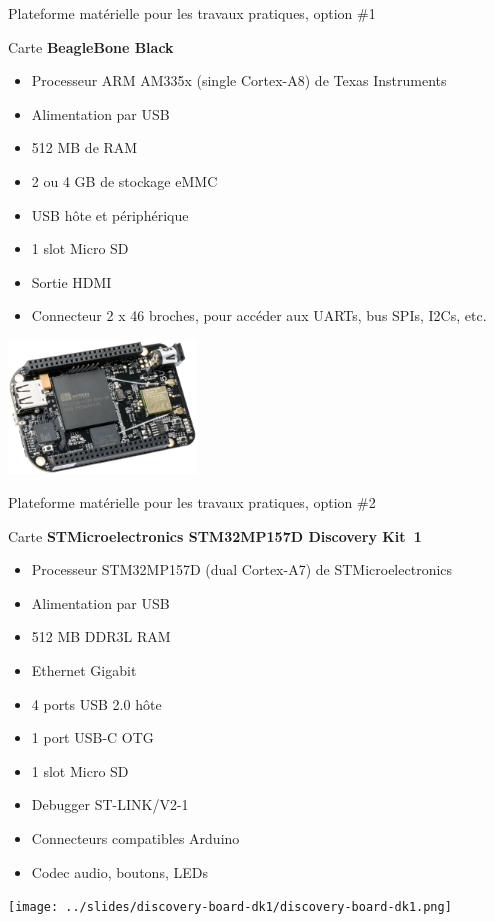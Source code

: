 \documentclass[a4paper,12pt,obeyspaces,spaces,hyphens]{article}
\begin{document}
\feagendatwocolumn
{Plateforme matérielle pour les travaux pratiques, option \#1}
{
  Carte {\bf BeagleBone Black}
  \begin{itemize}
  \item Processeur ARM AM335x (single Cortex-A8) de Texas Instruments
  \item Alimentation par USB
  \item 512 MB de RAM
  \item 2 ou 4 GB de stockage eMMC
  \item USB hôte et périphérique
  \item 1 slot Micro SD
  \item Sortie HDMI
  \item Connecteur 2 x 46 broches, pour accéder aux UARTs, bus SPIs, I2Cs, etc.
  \end{itemize}
}
{}
{
  \begin{center}
    \includegraphics[width=5cm]{../slides/beagleboneblack-board/beagleboneblack.png}
  \end{center}
}

\feagendatwocolumn
{Plateforme matérielle pour les travaux pratiques, option \#2}
{
  Carte {\bf STMicroelectronics STM32MP157D Discovery Kit~1}
  \begin{itemize}
  \item Processeur STM32MP157D (dual Cortex-A7) de STMicroelectronics
  \item Alimentation par USB
  \item 512 MB DDR3L RAM
  \item Ethernet Gigabit
  \item 4 ports USB 2.0 hôte
  \item 1 port USB-C OTG
  \item 1 slot Micro SD
  \item Debugger ST-LINK/V2-1
  \item Connecteurs compatibles Arduino
  \item Codec audio, boutons, LEDs
  \end{itemize}
}
{}
{
  \begin{center}
    \texttt{[image: ../slides/discovery-board-dk1/discovery-board-dk1.png]}
  \end{center}
}
\end{document}
